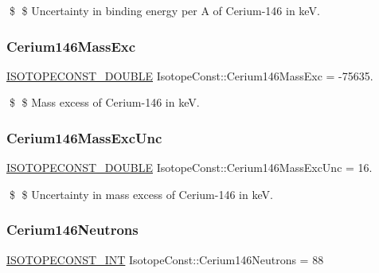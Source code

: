 \$ \$ Uncertainty in binding energy per A of Cerium-\/146 in keV. \mbox{\label{group___isotope_const-_cerium-_ce146_ga57ea407d1da4a44eb3d45db38970fa38}} 
\subsubsection{\texorpdfstring{Cerium146\+Mass\+Exc}{Cerium146MassExc}}
{\footnotesize\ttfamily \mbox{\hyperlink{group___isotope_const-_macros_ga8f45a7272ce02c0b4c65c44636ed719a}{I\+S\+O\+T\+O\+P\+E\+C\+O\+N\+S\+T\+\_\+\+D\+O\+U\+B\+LE}} Isotope\+Const\+::\+Cerium146\+Mass\+Exc = -\/75635.}

\$ \$ Mass excess of Cerium-\/146 in keV. \mbox{\label{group___isotope_const-_cerium-_ce146_gac2b7c197da52e5ee2f4279fddfbb616f}} 
\subsubsection{\texorpdfstring{Cerium146\+Mass\+Exc\+Unc}{Cerium146MassExcUnc}}
{\footnotesize\ttfamily \mbox{\hyperlink{group___isotope_const-_macros_ga8f45a7272ce02c0b4c65c44636ed719a}{I\+S\+O\+T\+O\+P\+E\+C\+O\+N\+S\+T\+\_\+\+D\+O\+U\+B\+LE}} Isotope\+Const\+::\+Cerium146\+Mass\+Exc\+Unc = 16.}

\$ \$ Uncertainty in mass excess of Cerium-\/146 in keV. \mbox{\label{group___isotope_const-_cerium-_ce146_ga983d5d8d4bd9de03e1e65aab83eb8b7a}} 
\subsubsection{\texorpdfstring{Cerium146\+Neutrons}{Cerium146Neutrons}}
{\footnotesize\ttfamily \mbox{\hyperlink{group___isotope_const-_macros_ga5f18360b3e99483a35c32d789e62621c}{I\+S\+O\+T\+O\+P\+E\+C\+O\+N\+S\+T\+\_\+\+I\+NT}} Isotope\+Const\+::\+Cerium146\+Neutrons = 88}

